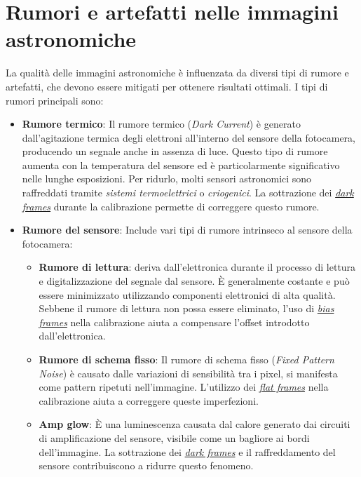 \section{Rumori e artefatti nelle immagini astronomiche} \label{sec:noise}

La qualità delle immagini astronomiche è influenzata da diversi tipi di rumore e artefatti, che devono essere mitigati per ottenere risultati ottimali. I tipi di rumori principali sono:

\begin{itemize}
    \item \textbf{Rumore termico}: Il rumore termico (\textit{Dark Current}) è generato dall'agitazione termica degli elettroni all'interno del sensore della fotocamera, producendo un segnale anche in assenza di luce. Questo tipo di rumore aumenta con la temperatura del sensore ed è particolarmente significativo nelle lunghe esposizioni. Per ridurlo, molti sensori astronomici sono raffreddati tramite \textit{sistemi termoelettrici} o \textit{criogenici}. La sottrazione dei \hyperref[subsec:dark]{\textit{dark frames}} durante la calibrazione permette di correggere questo rumore.
    
    \item \textbf{Rumore del sensore}: Include vari tipi di rumore intrinseco al sensore della fotocamera:
    
    \begin{itemize}
        \item \textbf{Rumore di lettura}: deriva dall'elettronica durante il processo di lettura e digitalizzazione del segnale dal sensore. È generalmente costante e può essere minimizzato utilizzando componenti elettronici di alta qualità. Sebbene il rumore di lettura non possa essere eliminato, l'uso di \hyperref[subsec:bias]{\textit{bias frames}} nella calibrazione aiuta a compensare l'offset introdotto dall'elettronica.
        
        \item \textbf{Rumore di schema fisso}: Il rumore di schema fisso (\textit{Fixed Pattern Noise}) è causato dalle variazioni di sensibilità tra i pixel, si manifesta come pattern ripetuti nell'immagine. L'utilizzo dei \hyperref[subsec:flat]{\textit{flat frames}} nella calibrazione aiuta a correggere queste imperfezioni.
        
        \item \textbf{Amp glow}: È una luminescenza causata dal calore generato dai circuiti di amplificazione del sensore, visibile come un bagliore ai bordi dell'immagine. La sottrazione dei \hyperref[subsec:dark]{\textit{dark frames}} e il raffreddamento del sensore contribuiscono a ridurre questo fenomeno.
    \end{itemize}
    

\end{itemize}
